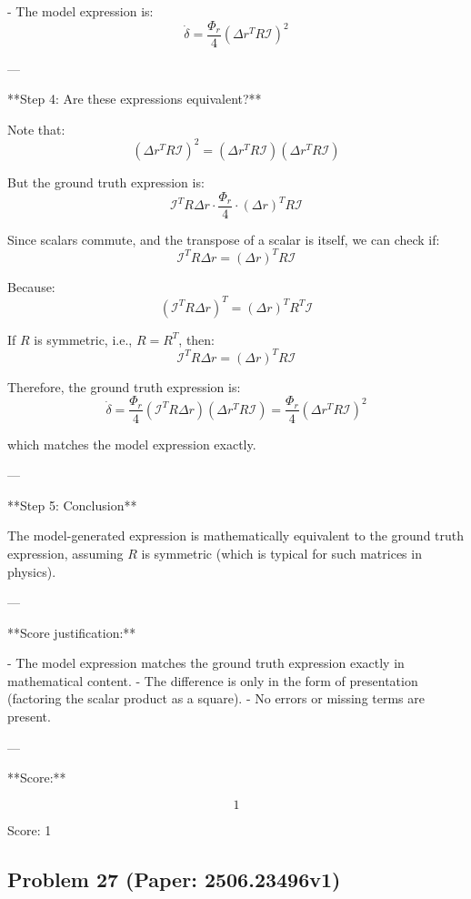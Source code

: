 \documentclass[10pt]{article}
\begin{document}
- The model expression is:
\[
\dot{\delta} = \frac{\Phi_r}{4} \left(\Delta r^{T} R \mathcal{I}\right)^2
\]

---

**Step 4: Are these expressions equivalent?**

Note that:
\[
\left(\Delta r^{T} R \mathcal{I}\right)^2 = \left(\Delta r^{T} R \mathcal{I}\right) \left(\Delta r^{T} R \mathcal{I}\right)
\]

But the ground truth expression is:
\[
\mathcal{I}^T R \Delta r \cdot \frac{\Phi_r}{4} \cdot (\Delta r)^T R \mathcal{I}
\]

Since scalars commute, and the transpose of a scalar is itself, we can check if:
\[
\mathcal{I}^T R \Delta r = (\Delta r)^T R \mathcal{I}
\]

Because:
\[
(\mathcal{I}^T R \Delta r)^T = (\Delta r)^T R^T \mathcal{I}
\]

If $R$ is symmetric, i.e., $R = R^T$, then:
\[
\mathcal{I}^T R \Delta r = (\Delta r)^T R \mathcal{I}
\]

Therefore, the ground truth expression is:
\[
\dot{\delta} = \frac{\Phi_r}{4} \left(\mathcal{I}^T R \Delta r\right) \left(\Delta r^T R \mathcal{I}\right) = \frac{\Phi_r}{4} \left(\Delta r^T R \mathcal{I}\right)^2
\]

which matches the model expression exactly.

---

**Step 5: Conclusion**

The model-generated expression is mathematically equivalent to the ground truth expression, assuming $R$ is symmetric (which is typical for such matrices in physics).

---

**Score justification:**

- The model expression matches the ground truth expression exactly in mathematical content.
- The difference is only in the form of presentation (factoring the scalar product as a square).
- No errors or missing terms are present.

---

**Score:**

\[
\boxed{1}
\]

Score: 1

\newpage
\subsection*{Problem 27 (Paper: 2506.23496v1)}
\end{document}

